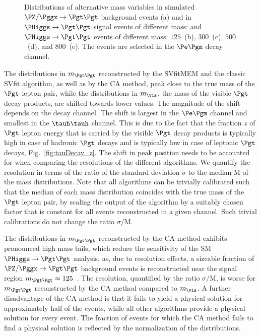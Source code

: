 \begin{figure}
\begin{center}
\end{center}
\caption{
  Distributions of alternative mass variables in simulated $\PZ/\Pggx \to \Pgt\Pgt$ background events (a) 
  and in $\PHiggs \to \Pgt\Pgt$ signal events of different mass:
  and $\PHiggs \to \Pgt\Pgt$ events of different mass:
  $125$~\GeV (b), $300$~\GeV (c), $500$~\GeV (d), and $800$~\GeV (e).
  The events are selected in the $\Pe\Pgm$ decay channel.
}
\label{fig:massDistributions_emu}
\end{figure}

The distributions in $m_{\Pgt\Pgt}$ reconstructed by the SVfitMEM and the classic SVfit algorithm,
as well as by the CA method, peak close to the true mass of the $\Pgt$ lepton pair,
while the distributions in $m_{\vis}$,
the mass of the visible $\Pgt$ decay products,
are shifted towards lower values.
The magnitude of the shift depends on the decay channel.
The shift is largest in the $\Pe\Pgm$ channel and smallest in the $\tauh\tauh$ channel.
This is due to the fact that the fraction $z$ of $\Pgt$ lepton energy that is carried by the visible $\Pgt$ decay products
is typically high in case of hadronic $\Pgt$ decays and is typically low in case of leptonic $\Pgt$ decays,
\cf Fig.~\ref{fig:tauDecay_z}.
The shift in peak position needs to be accounted for when comparing the resolutions of the different algorithms.
We quantify the resolution in terms of the ratio
of the standard deviation $\sigma$ to the median $\textrm{M}$
of the mass distributions.
Note that all algorithms can be trivially calibrated such that the median of each mass distribution coincides with the true mass of the $\Pgt$ lepton pair,
by scaling the output of the algorithm by a suitably chosen factor that is constant for all events reconstructed in a given channel.
Such trivial calibrations do not change the ratio $\sigma/\textrm{M}$.

The distributions in $m_{\Pgt\Pgt}$ reconstructed by the CA method
exhibits pronounced high mass tails, which reduce the sensitivity of the SM $\PHiggs \to \Pgt\Pgt$ analysis,
as, due to resolution effects, a sizeable fraction of $\PZ/\Pggx \to \Pgt\Pgt$ background events
is reconstructed near the signal region $m_{\Pgt\Pgt} \approx 125$~\GeV.
The resolution, quantified by the ratio $\sigma/\textrm{M}$,
is worse for $m_{\Pgt\Pgt}$ reconstructed by the CA method compared to $m_{\vis}$.
A further disadvantage of the CA method is that it fails to yield a physical solution for approximately half of the events,
while all other algorithms provide a physical solution for every event.
The fraction of events for which the CA method fails to find a physical solution is reflected by the normalization of the distributions.

